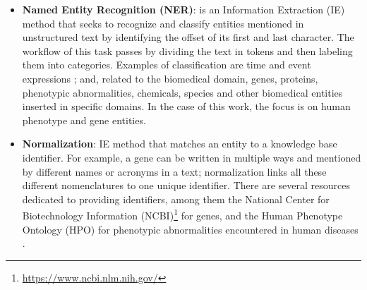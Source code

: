 \documentclass[11pt]{article}
\begin{document}
\begin{itemize}


\item{\textbf{Named Entity Recognition (NER)}: is an Information Extraction (IE) method that seeks to recognize and classify entities mentioned in unstructured text by identifying the offset of its first and last character. The workflow of this task passes by dividing the text in tokens and then labeling them into categories. Examples of classification are time and event expressions \cite{ULISBOA}; and, related to the biomedical domain, genes, proteins, phenotypic abnormalities, chemicals, species and other biomedical entities inserted in specific domains. In the case of this work, the focus is on human phenotype and gene entities.}

\item{\textbf{Normalization}: IE method that matches an entity to a knowledge base identifier. For example, a gene can be written in multiple ways and mentioned by different names or acronyms in a text; normalization links all these different nomenclatures to one unique identifier. There are several resources dedicated to providing identifiers, among them the National Center for Biotechnology Information (NCBI)\footnote{\url{https://www.ncbi.nlm.nih.gov/}} for genes, and the Human Phenotype Ontology (HPO) for phenotypic abnormalities encountered in human diseases \cite{HPO}.}



\end{itemize}
\end{document}
